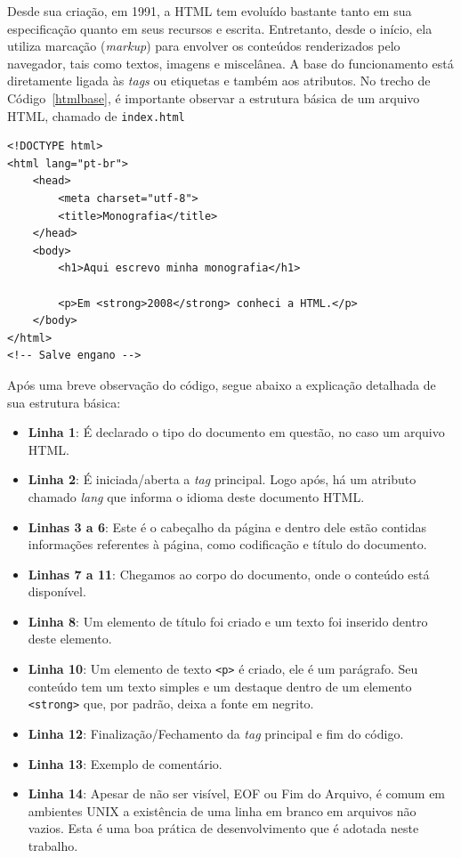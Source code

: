 Desde sua criação, em 1991, a HTML tem evoluído bastante tanto em sua especificação quanto em seus recursos e escrita. Entretanto, desde o início, ela utiliza marcação (\textit{markup}) para envolver os conteúdos renderizados pelo navegador, tais como textos, imagens e miscelânea. A base do funcionamento está diretamente ligada às \textit{tags} ou etiquetas e também aos atributos. No trecho de Código~\ref{htmlbase}, é importante observar a estrutura básica de um arquivo HTML, chamado de \texttt{index.html}
\begin{lstlisting}[label=htmlbase,caption=Estrutura Básica de um código HTML.]
<!DOCTYPE html>
<html lang="pt-br">
    <head>
        <meta charset="utf-8">
        <title>Monografia</title>
    </head>
    <body>
        <h1>Aqui escrevo minha monografia</h1>
        
        <p>Em <strong>2008</strong> conheci a HTML.</p>
    </body>
</html>
<!-- Salve engano -->

\end{lstlisting}

Após uma breve observação do código, segue abaixo a explicação detalhada de sua estrutura básica:
\begin{itemize}
    \item \textbf{Linha 1}: É declarado o tipo do documento em questão, no caso um arquivo HTML.
    \item \textbf{Linha 2}: É iniciada/aberta a \textit{tag} principal. Logo após, há um atributo chamado \textit{lang} que informa o idioma deste documento HTML.
    \item \textbf{Linhas 3 a 6}: Este é o cabeçalho da página e dentro dele estão contidas informações referentes à página, como codificação e título do documento.
    \item \textbf{Linhas 7 a 11}: Chegamos ao corpo do documento, onde o conteúdo está disponível.
    \item \textbf{Linha 8}: Um elemento de título foi criado e um texto foi inserido dentro deste elemento.
    \item \textbf{Linha 10}: Um elemento de texto \texttt{<p>} é criado, ele é um parágrafo. Seu conteúdo tem um texto simples e um destaque dentro de um elemento \texttt{<strong>} que, por padrão, deixa a fonte em negrito.
    \item \textbf{Linha 12}: Finalização/Fechamento da \textit{tag} principal e fim do código.
    \item \textbf{Linha 13}: Exemplo de comentário.
    \item \textbf{Linha 14}: Apesar de não ser visível, EOF ou Fim do Arquivo, é comum em ambientes UNIX a existência de uma linha em branco em arquivos não vazios. Esta é uma boa prática de desenvolvimento que é adotada neste trabalho.
\end{itemize}

